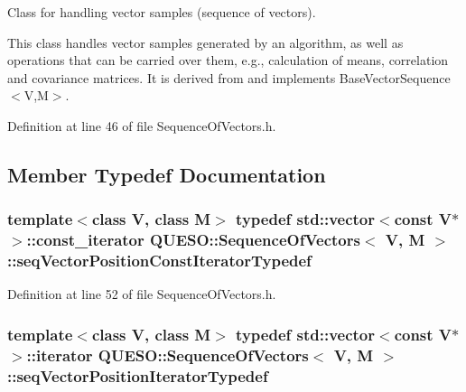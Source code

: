 Class for handling vector samples (sequence of vectors). 

This class handles vector samples generated by an algorithm, as well as operations that can be carried over them, e.\-g., calculation of means, correlation and covariance matrices. It is derived from and implements Base\-Vector\-Sequence$<$\-V,\-M$>$. 

Definition at line 46 of file Sequence\-Of\-Vectors.\-h.



\subsection{Member Typedef Documentation}
\hypertarget{class_q_u_e_s_o_1_1_sequence_of_vectors_a32cf32ccc0f85d14f227dc13399d2e0a}{
\subsubsection[{seq\-Vector\-Position\-Const\-Iterator\-Typedef}]{\setlength{\rightskip}{0pt plus 5cm}template$<$class V, class M$>$ typedef std\-::vector$<$const V$\ast$$>$\-::const\-\_\-iterator {\bf Q\-U\-E\-S\-O\-::\-Sequence\-Of\-Vectors}$<$ V, M $>$\-::{\bf seq\-Vector\-Position\-Const\-Iterator\-Typedef}}}\label{class_q_u_e_s_o_1_1_sequence_of_vectors_a32cf32ccc0f85d14f227dc13399d2e0a}


Definition at line 52 of file Sequence\-Of\-Vectors.\-h.

\hypertarget{class_q_u_e_s_o_1_1_sequence_of_vectors_ac33b1b9b3f22325b49618a6591dce818}{
\subsubsection[{seq\-Vector\-Position\-Iterator\-Typedef}]{\setlength{\rightskip}{0pt plus 5cm}template$<$class V, class M$>$ typedef std\-::vector$<$const V$\ast$$>$\-::iterator {\bf Q\-U\-E\-S\-O\-::\-Sequence\-Of\-Vectors}$<$ V, M $>$\-::{\bf seq\-Vector\-Position\-Iterator\-Typedef}}}\label{class_q_u_e_s_o_1_1_sequence_of_vectors_ac33b1b9b3f22325b49618a6591dce818}


